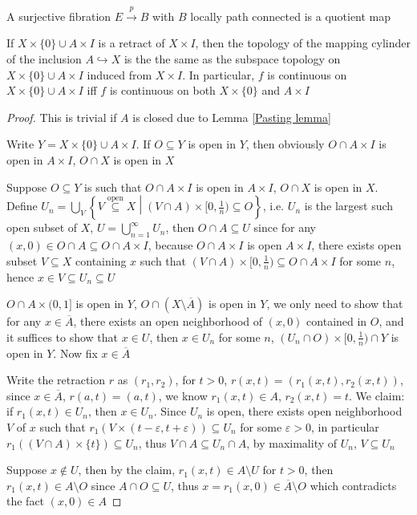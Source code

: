 \documentclass[main]{subfiles}
\begin{document}
\begin{lemma}
A surjective fibration $E\xrightarrow{p}B$ with $B$ locally path connected is a quotient map
\end{lemma}

\begin{lemma}\label{Mapping cylinder of inclusion has subspace topology if it is a retraction}
If $X\times\{0\}\cup A\times I$ is a retract of $X\times I$, then the topology of the mapping cylinder of the inclusion $A\hookrightarrow X$ is the the same as the subspace topology on $X\times\{0\}\cup A\times I$ induced from $X\times I$. In particular, $f$ is continuous on $X\times\{0\}\cup A\times I$ iff $f$ is continuous on both $X\times\{0\}$ and $A\times I$
\end{lemma}

\begin{proof}
This is trivial if $A$ is closed due to Lemma \ref{Pasting lemma} \par
Write $Y=X\times\{0\}\cup A\times I$. If $O\subseteq Y$ is open in $Y$, then obviously $O\cap A\times I$ is open in $A\times I$, $O\cap X$ is open in $X$ \par
Suppose $O\subseteq Y$ is such that $O\cap A\times I$ is open in $A\times I$, $O\cap X$ is open in $X$. Define  $\displaystyle U_n=\bigcup_V\left\{V\overset{\mathrm{open}}{\subseteq}X\middle|(V\cap A)\times[0,\textstyle\frac{1}{n})\subseteq O\right\}$, i.e. $U_n$ is the largest such open subset of $X$, $U=\bigcup_{n=1}^\infty U_n$, then $O\cap A\subseteq U$ since for any $(x,0)\in O\cap A\subseteq O\cap A\times I$, because $O\cap A\times I$ is open $A\times I$, there exists open subset $V\subseteq X$ containing $x$ such that $(V\cap A)\times[0,\frac{1}{n})\subseteq O\cap A\times I$ for some $n$, hence $x\in V\subseteq U_n\subseteq U$ \par
$O\cap A\times(0,1]$ is open in $Y$, $O\cap(X\setminus\overline A)$ is open in $Y$, we only need to show that for any $x\in\overline A$, there exists an open neighborhood of $(x,0)$ contained in $O$, and it suffices to show that $x\in U$, then $x\in U_n$ for some $n$, $(U_n\cap O)\times[0,\frac{1}{n})\cap Y$ is open in $Y$. Now fix $x\in\overline A$ \par
Write the retraction $r$ as $(r_1,r_2)$, for $t>0$, $r(x,t)=(r_1(x,t),r_2(x,t))$, since $x\in\overline A$, $r(a,t)=(a,t)$, we know $r_1(x,t)\in A$, $r_2(x,t)=t$. We claim: if $r_1(x,t)\in U_n$, then $x\in U_n$. Since $U_n$ is open, there exists open neighborhood $V$ of $x$ such that $r_1(V\times(t-\varepsilon,t+\varepsilon))\subseteq U_n$ for some $\varepsilon>0$, in particular $r_1((V\cap A)\times\{t\})\subseteq U_n$, thus $V\cap A\subseteq U_n\cap A$, by maximality of $U_n$, $V\subseteq U_n$ \par
Suppose $x\notin U$, then by the claim, $r_1(x,t)\in A\setminus U$ for $t>0$, then $r_1(x,t)\in A\setminus O$ since $A\cap O\subseteq U$, thus $x=r_1(x,0)\in\overline A\setminus O$ which contradicts the fact $(x,0)\in A$
\end{proof}
\end{document}
